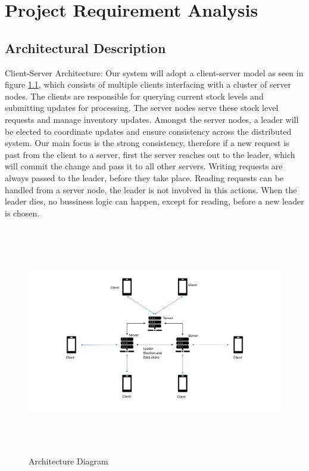 \chapter{Project Requirement Analysis}\label{ch:ProjectRequirementAnalysis}
\section{Architectural Description}\label{sec:ArchitecturalDescription}
Client-Server Architecture: Our system will adopt a client-server model as seen in figure \ref{fig:architecture}, which consists of multiple clients interfacing with a cluster of server nodes. The clients are responsible for querying current stock levels and submitting updates for processing. The server nodes serve these stock level requests and manage inventory updates. Amongst the server nodes, a leader will be elected to coordinate updates and ensure consistency across the distributed system. 
Our main focus is the strong consistency, therefore if a new request is past from the client to a server, first the server reaches out to the leader, which will commit the change and pass it to all other servers. Writing requests are always 
passed to the leader, before they take place. Reading requests can be handled from a server node, the leader is not involved in this actions. When the leader dies, no bussiness logic can happen, except for reading, before a new leader is chosen.

\begin{figure}[h!]
        \includegraphics[height=10cm, width=18cm]{images/Architecture.png}
        \caption{Architecture Diagram}
        \label{fig:architecture}
\end{figure}


